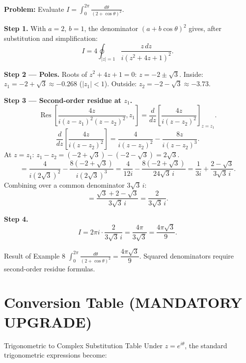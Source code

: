 \documentclass[12pt,a4paper]{article}
\begin{document}
\textbf{Problem:} Evaluate $I = \displaystyle\int_0^{2\pi}\frac{d\theta}{(2+\cos\theta)^2}$.

\textbf{Step 1.} With $a=2$, $b=1$, the denominator $(a+b\cos\theta)^2$ gives,
after substitution and simplification:
\[
  I = 4\oint_{|z|=1}\frac{z\,dz}{i(z^2+4z+1)^2}.
\]

\textbf{Step 2 --- Poles.} Roots of $z^2+4z+1=0$:
$z = -2\pm\sqrt{3}$.
Inside: $z_1 = -2+\sqrt{3}\approx -0.268$ ($|z_1|<1$).
Outside: $z_2 = -2-\sqrt{3}\approx -3.73$.

\textbf{Step 3 --- Second-order residue at $z_1$.}
\[
  \operatorname{Res}\!\left[\frac{4z}{i(z-z_1)^2(z-z_2)^2},z_1\right]
  = \frac{d}{dz}\!\left[\frac{4z}{i(z-z_2)^2}\right]_{z=z_1}.
\]
\[
  \frac{d}{dz}\!\left[\frac{4z}{i(z-z_2)^2}\right]
  = \frac{4}{i(z-z_2)^2} - \frac{8z}{i(z-z_2)^3}.
\]
At $z = z_1$: $z_1 - z_2 = (-2+\sqrt{3})-(-2-\sqrt{3}) = 2\sqrt{3}$.
\[
  = \frac{4}{i(2\sqrt{3})^2} - \frac{8(-2+\sqrt{3})}{i(2\sqrt{3})^3}
  = \frac{4}{12i} - \frac{8(-2+\sqrt{3})}{24\sqrt{3}\,i}
  = \frac{1}{3i} + \frac{2-\sqrt{3}}{3\sqrt{3}\,i}.
\]
Combining over a common denominator $3\sqrt{3}\,i$:
\[
  = \frac{\sqrt{3} + 2 - \sqrt{3}}{3\sqrt{3}\,i} = \frac{2}{3\sqrt{3}\,i}.
\]

\textbf{Step 4.}
\[
  I = 2\pi i \cdot \frac{2}{3\sqrt{3}\,i} = \frac{4\pi}{3\sqrt{3}} = \frac{4\pi\sqrt{3}}{9}.
\]

\begin{learnbox}{Result of Example 8}
$\displaystyle\int_0^{2\pi}\frac{d\theta}{(2+\cos\theta)^2} = \dfrac{4\pi\sqrt{3}}{9}$.
Squared denominators require second-order residue formulas.
\end{learnbox}

\section{Conversion Table (MANDATORY UPGRADE)}

\begin{infobox}{Trigonometric to Complex Substitution Table}
Under $z = e^{i\theta}$, the standard trigonometric expressions become:
\end{infobox}
\end{document}
